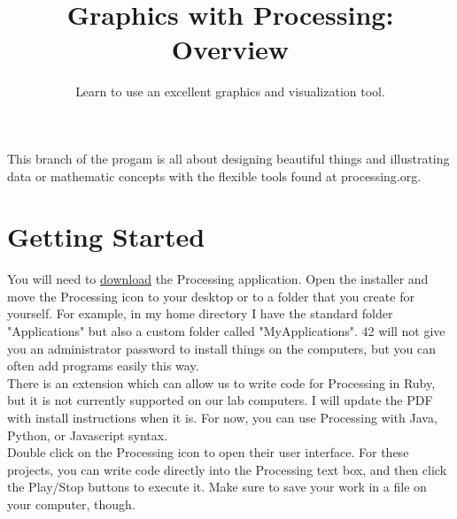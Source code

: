 \documentclass{42-en}
\begin{document}
\title{Graphics with Processing: Overview}
\subtitle{Learn to use an excellent graphics and visualization tool.}


\summary
{
	This branch of the progam is all about designing beautiful things and illustrating
	data or mathematic concepts with the flexible tools found at processing.org.
}

\maketitle

\tableofcontents


\chapter{Getting Started}

You will need to \href{https://processing.org/download/}{download} the Processing application. Open the installer and move the Processing icon to your desktop or to a folder that you create for yourself. For example, in my home directory I have the standard folder "Applications" but also a custom folder called "MyApplications". 42 will not give you an administrator password to install things on the computers, but you can often add programs easily this way.\\

There is an extension which can allow us to write code for Processing in Ruby, but it is not currently supported on our lab computers. I will update the PDF with install instructions when it is. For now, you can use Processing with Java, Python, or Javascript syntax.\\

Double click on the Processing icon to open their user interface. For these projects, you can write code directly into the Processing text box, and then click the Play/Stop buttons to execute it. Make sure to save your work in a file on your computer, though.\\
\end{document}
